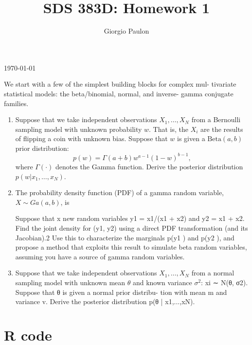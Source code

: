 \documentclass{homework}
\title{SDS 383D: Homework 1}
\author{Giorgio Paulon}
\begin{document}
\makeatletter
\begin{titlepage}
	\vspace*{\fill}
	\centering
	{\huge \@title \par}
	\vskip0.5cm
	{\large \@author \par}
	\vskip0.5cm
	{\large \today \par}
	\vspace*{\fill}
\end{titlepage}
\makeatother

\newpage 
\mbox{}
\thispagestyle{empty}
\newpage

\setcounter{page}{1}


We start with a few of the simplest building blocks for complex mul- tivariate statistical models: the beta/binomial, normal, and inverse- gamma conjugate families.

\begin{enumerate}[label=(\Alph*)]
\item Suppose that we take independent observations $X_1, \dots , X_N$ from a Bernoulli sampling model with unknown probability $w$. That is, the $X_i$ are the results of flipping a coin with unknown bias. Suppose that $w$ is given a $\text{Beta}(a,b)$ prior distribution:
$$p(w) = \Gamma(a + b) w^{a-1} (1 - w)^{b-1},$$
where $\Gamma(\cdot)$ denotes the Gamma function. Derive the posterior distribution $p(w | x_1,\dots,x_N)$.



\item The probability density function (PDF) of a gamma random variable, $X \sim Ga(a, b)$, is


Suppose that x
new random variables y1 = x1/(x1 + x2) and y2 = x1 + x2. Find the joint density for (y1, y2) using a direct PDF transformation (and its Jacobian).2 Use this to characterize the marginals p(y1 ) and p(y2 ), and propose a method that exploits this result to simulate beta random variables, assuming you have a source of gamma random variables.



\item Suppose that we take independent observations $X_1, \dots , X_N$ from a normal sampling model with unknown mean $\theta$ and known variance $\sigma^2$: xi ∼ N(θ, σ2). Suppose that θ is given a normal prior distribu- tion with mean m and variance v. Derive the posterior distribution p(θ | x1,...,xN).

\end{enumerate}

\clearpage

\appendix
\chapter{R code}
\label{chap:code}
\end{document}
